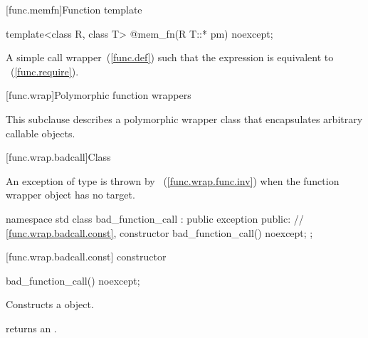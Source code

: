 [func.memfn]{Function template }%

%
\begin{itemdecl}
template<class R, class T> @\unspec@ mem_fn(R T::* pm) noexcept;
\end{itemdecl}

\begin{itemdescr}
\pnum
\returns A simple call wrapper~(\ref{func.def}) 
such that the expression  is equivalent
to ~(\ref{func.require}).
\end{itemdescr}

[func.wrap]{Polymorphic function wrappers}%

\pnum
This subclause describes a polymorphic wrapper class that
encapsulates arbitrary callable objects.

[func.wrap.badcall]{Class }%
%

\pnum
An exception of type  is thrown by
~(\ref{func.wrap.func.inv})
when the function wrapper object has no target.

\begin{codeblock}
namespace std {
  class bad_function_call : public exception {
  public:
    // \ref{func.wrap.badcall.const}, constructor
    bad_function_call() noexcept;
  };
}
\end{codeblock}

[func.wrap.badcall.const]{ constructor}

%
%
\begin{itemdecl}
bad_function_call() noexcept;
\end{itemdecl}

\begin{itemdescr}
\pnum\effects Constructs a  object.
\end{itemdescr}

\begin{itemdescr}
\pnum\postconditions  {} returns an
 \ntbs.
\end{itemdescr}

